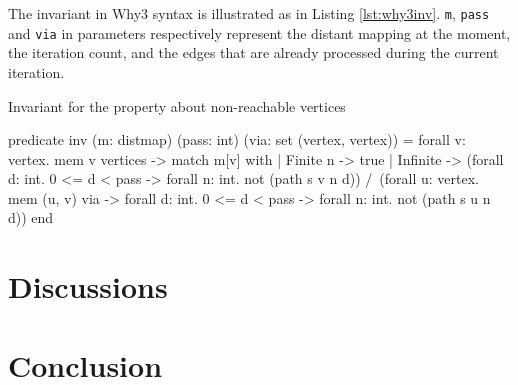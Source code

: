 \documentclass[a4paper,12pt]{article}
\begin{document}
The invariant in Why3 syntax is illustrated as in Listing
\ref{lst:why3inv}. \texttt{m}, \texttt{pass} and \texttt{via} in
parameters respectively represent the distant mapping at the moment,
the iteration count, and the edges that are already processed during
the current iteration.

\begin{algorithm}
\caption{Invariant for the property about non-reachable vertices}\label{lst:why3inv}
\begin{why3}
predicate inv (m: distmap) (pass: int) (via: set (vertex, vertex)) =
  forall v: vertex. mem v vertices ->
  match m[v] with
    | Finite n -> true
    | Infinite ->
      (forall d: int. 0 <= d < pass ->
        forall n: int. not (path s v n d)) /\
      (forall u: vertex. mem (u, v) via ->
        forall d: int. 0 <= d < pass ->
        forall n: int. not (path s u n d))
  end
\end{why3}
\end{algorithm}

\section{Discussions}


\section{Conclusion}

\pagestyle{empty}



\end{document}

